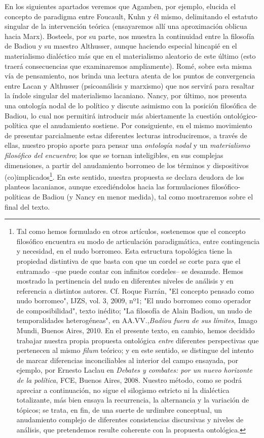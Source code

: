 \documentclass{book}
\begin{document}
En los siguientes apartados veremos que Agamben, por ejemplo, elucida el
concepto de paradigma entre Foucault, Kuhn y él mismo, delimitando el
estatuto singular de la intervención teórica (ensayaremos allí una
aproximación oblicua hacia Marx). Bosteels, por su parte, nos muestra la
continuidad entre la filosofía de Badiou y su maestro Althusser, aunque
haciendo especial hincapié en el materialismo dialéctico más que en el
materialismo aleatorio de este último (esto traerá consecuencias que
examinaremos ampliamente). Romé, sobre esta misma vía de pensamiento,
nos brinda una lectura atenta de los puntos de convergencia entre Lacan
y Althusser (psicoanálisis y marxismo) que nos servirá para resaltar la
índole singular del materialismo lacaniano. Nancy, por último, nos
presenta una ontología nodal de lo político y discute asimismo con la
posición filosófica de Badiou, lo cual nos permitirá introducir más
abiertamente la cuestión ontológico-política que el anudamiento
sostiene. Por consiguiente, en el mismo movimiento de presentar
parcialmente estas diferentes lecturas introduciremos, a través de
ellas, nuestro propio aporte para pensar una \emph{ontología nodal} y un
\emph{materialismo filosófico del encuentro}; los que se tornan
inteligibles, en sus complejas dimensiones, a partir del anudamiento
borromeo de los términos y dispositivos (co)implicados\footnote{Tal como
  hemos formulado en otros artículos, sostenemos que el concepto
  filosófico encuentra su modo de articulación paradigmática, entre
  contingencia y necesidad, en el nudo borromeo. Esta estructura
  topológica tiene la propiedad distintiva de que basta con que un
  cordel se corte para que el entramado --que puede contar con infinitos
  cordeles-- se desanude. Hemos mostrado la pertinencia del nudo en
  diferentes niveles de análisis y en referencia a distintos autores.
  Cf. Roque Farrán, "El concepto pensado como nudo borromeo", IJZS, vol.
  3, 2009, nº1; "El nudo borromeo como operador de composibilidad",
  texto inédito; "La filosofía de Alain Badiou, un nudo de
  temporalidades heterogéneas", en AA.VV.,\emph{Badiou fuera de sus
  límites}, Imago Mundi, Buenos Aires, 2010. En el presente texto, en
  cambio, hemos decidido trabajar nuestra propia propuesta ontológica
  \emph{entre} diferentes perspectivas que pertenecen al mismo
  \emph{filum} teórico; y en este sentido, se distingue del intento de
  marcar diferencias inconciliables al interior del campo ensayada, por
  ejemplo, por Ernesto Laclau en \emph{Debates y combates: por un nuevo
  horizonte de la política}, FCE, Buenos Aires, 2008. Nuestro método,
  como se podrá apreciar a continuación, no sigue el silogismo estricto
  ni la dialéctica totalizante, más bien ensaya la recurrencia, la
  alternancia y la variación de tópicos; se trata, en fin, de una suerte
  de urdimbre conceptual, un anudamiento complejo de diferentes
  consistencias discursivas y niveles de análisis, que pretendemos
  resulte coherente con la propuesta ontológica.}. En este sentido,
nuestra propuesta se declara deudora de los planteos lacanianos, aunque
excediéndolos hacia las formulaciones filosófico-políticas de Badiou (y
Nancy en menor medida), tal como mostraremos sobre el final del texto.
\end{document}
